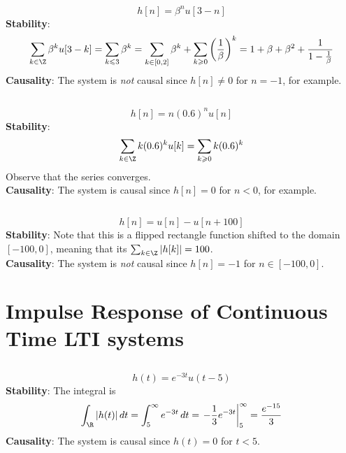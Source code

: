 \documentclass{article}
\begin{document}
\begin{equation}
    h[n] = \beta^n u[3 - n]
\end{equation}
\textbf{Stability}:
\begin{equation}
    \sum_{k \in \Z} \beta^k u[3 - k] = \sum_{k \leqslant 3} \beta^k = \sum_{k \in [0, 2]} \beta^k + \sum_{k \geqslant 0} \left(\frac{1}{\beta}\right)^k = 1 + \beta + \beta^2 + \frac{1}{1 - \frac{1}{\beta}}
\end{equation}
\textbf{Causality}: The system is \emph{not} causal since \(h[n] \neq 0\) for \(n = -1\), for example.

\subsection{}

\begin{equation}
    h[n] = n (0.6)^n u[n]
\end{equation}
\textbf{Stability}:
\begin{equation}
    \sum_{k \in \Z} k (0.6)^k u[k] = \sum_{k \geqslant 0} k (0.6)^k
\end{equation}
Observe that the series converges. \\ %
\textbf{Causality}: The system is causal since \(h[n] = 0\) for \(n < 0\), for example.

\subsection{}

\begin{equation}
    h[n] = u[n] - u[n + 100]
\end{equation}
\textbf{Stability}: Note that this is a flipped rectangle function shifted to the domain \([-100, 0]\), meaning that its \(\sum_{k \in \Z} |h[k]| = 100\). \\
\textbf{Causality}: The system is \emph{not} causal since \(h[n] = -1\) for \(n \in [-100, 0]\).

\section{Impulse Response of Continuous Time LTI systems}

\subsection{}

\begin{equation}
    h(t) = e^{-3t} u(t - 5)
\end{equation}
\textbf{Stability}: The integral is
\begin{equation}
    \int_{\R} |h(t)| \, dt = \int_5^\infty e^{-3t} \, dt = \left.-\frac{1}{3} e^{-3t}\right|_5^\infty = \frac{e^{-15}}{3}
\end{equation}
\textbf{Causality}: The system is causal since \(h(t) = 0\) for \(t < 5\).
\end{document}
